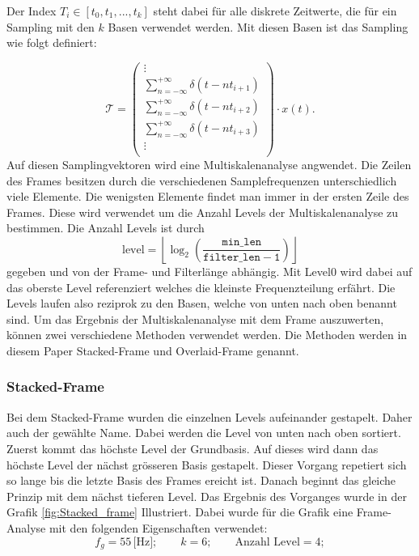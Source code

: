 Der Index $T_{i}\in[t_{0},t_{1},...,t_{k}]$ steht dabei für alle diskrete Zeitwerte, die für ein Sampling mit den $k$ Basen verwendet werden. Mit diesen Basen ist das Sampling wie folgt definiert:

\[
\mathcal{T}
=
\begin{pmatrix}
\vdots\\
\displaystyle\sum_{n=-\infty}^{+\infty} \delta(t - nt_{i+1})\\[1mm]
\displaystyle\sum_{n=-\infty}^{+\infty} \delta(t - nt_{i+2})\\[1mm]
\displaystyle\sum_{n=-\infty}^{+\infty} \delta(t - nt_{i+3})\\[1mm]
\vdots\\
\end{pmatrix}
\cdot x(t).
\]
Auf diesen Samplingvektoren wird eine Multiskalenanalyse angwendet. Die Zeilen des Frames besitzen durch die verschiedenen Samplefrequenzen unterschiedlich viele Elemente. Die wenigsten Elemente findet man immer in der ersten Zeile des Frames. Diese wird verwendet um die Anzahl Levels der Multiskalenanalyse zu bestimmen. Die Anzahl Levels ist durch
\[\text{level} = \left\lfloor\log_2\left(\mathtt{
	\frac{\text{min\_len}}{\text{filter\_len} -1}}\right)\right\rfloor
\]
gegeben und von der Frame- und Filterlänge abhängig.
Mit Level0 wird dabei auf das oberste Level referenziert welches die kleinste Frequenzteilung erfährt. Die Levels laufen also reziprok zu den Basen, welche von unten nach oben benannt sind. Um das Ergebnis der Multiskalenanalyse mit dem Frame auszuwerten, können zwei verschiedene Methoden verwendet werden. Die Methoden werden in diesem Paper Stacked-Frame und Overlaid-Frame genannt. 

\subsubsection{Stacked-Frame} 

Bei dem Stacked-Frame wurden die einzelnen Levels aufeinander gestapelt. Daher auch der gewählte Name. Dabei werden die Level von unten nach oben sortiert. Zuerst kommt das höchste Level der Grundbasis. Auf dieses wird dann das höchste Level der nächst grösseren Basis gestapelt. Dieser Vorgang repetiert sich so lange bis die letzte Basis des Frames ereicht ist. Danach beginnt das gleiche Prinzip mit dem nächst tieferen Level. Das Ergebnis des Vorganges wurde in der Grafik \ref{fig:Stacked_frame} Illustriert. Dabei wurde für die Grafik eine Frame-Analyse mit den folgenden Eigenschaften verwendet:
\[
f_{g}=55\,\text{[Hz]}; \qquad
k = 6 ; \qquad
\text{Anzahl Level}= 4;
\] 




